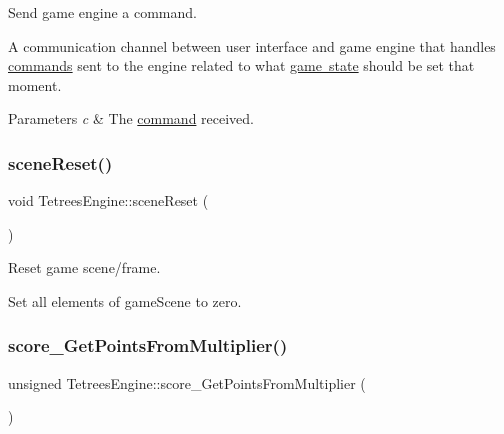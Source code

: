 Send game engine a command. 

A communication channel between user interface and game engine that handles \mbox{\hyperlink{TetreesDefs_8hpp_aadc337e2620d6621659e63e87c45e79d}{commands}} sent to the engine related to what \mbox{\hyperlink{TetreesDefs_8hpp_aebae08b2e3a36f1452b33acaf1eaab40}{game state}} should be set that moment. 
\begin{DoxyParams}{Parameters}
{\em c} & The \mbox{\hyperlink{TetreesDefs_8hpp_aadc337e2620d6621659e63e87c45e79d}{command}} received. \\
\hline
\end{DoxyParams}
\mbox{\label{classTetreesEngine_acb719449a68465839ebb0a5e7724cc34}} 
\subsubsection{\texorpdfstring{scene\+Reset()}{sceneReset()}}
{\footnotesize\ttfamily void Tetrees\+Engine\+::scene\+Reset (\begin{DoxyParamCaption}{ }\end{DoxyParamCaption})\hspace{0.3cm}{\ttfamily [private]}}



Reset game scene/frame. 

Set all elements of game\+Scene to zero. \mbox{\label{classTetreesEngine_a848fc0ff4003f3c4d74c11efdc91f0cb}} 
\subsubsection{\texorpdfstring{score\+\_\+\+Get\+Points\+From\+Multiplier()}{score\_GetPointsFromMultiplier()}}
{\footnotesize\ttfamily unsigned Tetrees\+Engine\+::score\+\_\+\+Get\+Points\+From\+Multiplier (\begin{DoxyParamCaption}{ }\end{DoxyParamCaption})\hspace{0.3cm}{\ttfamily [private]}}



